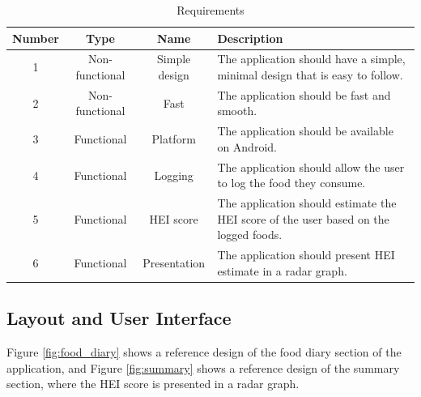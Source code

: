 \documentclass{article}
\begin{document}
\begin{table}[h]
\hspace*{-1.5cm} 
\centering
\begin{tabular}{||c|c|c|m{7cm}||}
\hline
    Number & Type & Name & Description \\ [0.5ex] 
    \hline 
    1 & Non-functional & Simple design & The application should have a simple, minimal design that is easy to follow. \\
    \hline 
    2 & Non-functional & Fast & The application should be fast and smooth. \\
    \hline 
    3 & Functional & Platform & The application should be available on Android. \\
    \hline
    4 & Functional & Logging & The application should allow the user to log the food they consume. \\
    \hline 
    5 & Functional & HEI score & The application should estimate the HEI score of the user based on the logged foods. \\
    \hline 
    6 & Functional & Presentation & The application should present HEI estimate in a radar graph. \\
\hline
\end{tabular}
\caption{Requirements}
\label{table:project_requirements}
\end{table}

\subsection{Layout and User Interface}
Figure \ref{fig:food_diary} shows a reference design of the food diary section of the application, and Figure \ref{fig:summary} shows a reference design of the summary section, where the HEI score is presented in a radar graph. 
\end{document}
